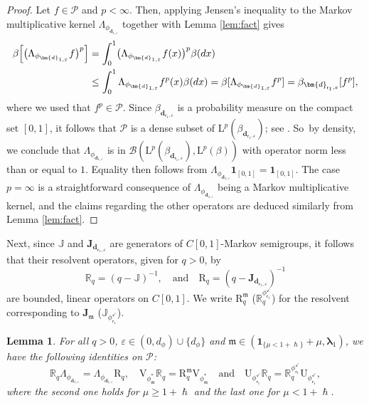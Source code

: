 \documentclass[10pt]{amsart}
\let\epsilon\varepsilon
\theoremstyle{plain}
\newtheorem{lemma}[theorem]{Lemma}
\theoremstyle{definition}
\newcommand{\Poly}{\mathscr{P}}
\newcommand{\calJ}{\mathds{J}}
\newcommand{\Leb}{\mathrm{L}}
\newcommand{\calJd}{\mathbf{J}}
\newcommand{\m}{\mathfrak{m}}
\newcommand{\dpt}{\bm{d}_{\vat,\epsilon}}
\newcommand{\dz}{{\bm{d}}_{1,\epsilon}}
\newcommand{\Bop}[2]{\mathcal{B}(#1,#2)}
\newcommand{\lam}{{\bm{\lambda}_1}}
\newcommand{\vat}{{\mathsf{r}_1}}
\newcommand{\phm}{{\phi_\m^*}}
\renewcommand{\varphi}{{\phi_{\vat}^{\checkmark}}}
\newcommand{\gab}[1][\lam,\mo]{{\beta_{#1}}}
\let\h\hslash
\let\mo\mu
\let\bpsi\beta
\begin{document}
\begin{proof}
Let $f \in \Poly$ and $p < \infty$. Then, applying Jensen's inequality to the Markov multiplicative kernel $\Lambda_{\phi_{\dz}}$ together with Lemma \ref{lem:fact} gives
\begin{align*}
\bpsi \Bigl[ \bigl(\Lambda_{\phi_{\dz}} f\bigr)^p\Bigr] &= \int_0^1 \bigl(\Lambda_{\phi_{\dz}} f(x) \bigr)^p \bpsi(dx)\\
&\leq \int_0^1 \Lambda_{\phi_{\dz}} f^p(x) \bpsi(dx) = \bpsi[\Lambda_{\phi_{\dz}} f^p] = \gab[\dpt] [ f^p],
\end{align*}
where we used that $f^p \in \Poly$. Since $\gab[\dpt]$ is a probability measure on the compact set $[0,1]$, it follows that $\Poly$ is a dense subset of $\Leb^p(\gab[\dpt])$; see \eg \cite[Cor.\,22.10]{Driver03}. So~by density, we conclude that $\Lambda_{\phi_{\dz}}$ is in $\Bop{\Leb^p(\gab[\dpt])}{\Leb^p(\bpsi)}$ with operator norm less than or equal to $1$. Equality then follows from $\Lambda_{\phi_{\dz}} \bm{1}_{[0,1]} = \bm{1}_{[0,1]}$. The case $p = \infty$ is a straightforward consequence of $\Lambda_{\phi_{\dz}}$ being a Markov multiplicative kernel, and the claims regarding the other operators are deduced similarly from Lemma \ref{lem:fact}.
\end{proof}

Next, since $\calJ$ and $\calJd_{\dpt}$ are generators of $C[0,1]$-Markov semigroups, it follows that their resolvent operators, given for $q > 0$, by
\begin{equation*}
\mathds{R}_q = (q-\calJ)^{-1}, \quad \text{and} \quad {\mathrm{R}}_q = (q-\calJd_{\dpt})^{-1}
\end{equation*}
are bounded, linear operators on $C[0,1]$. We write ${\mathrm{R}}_q^\m$ (\resp $\mathds{R}_q^\varphi$) for the resolvent corresponding to $\mathbf{J}_\m$ (\resp $\calJ_\varphi$).

\begin{lemma}
\label{prop:resolvent-intertwining}
For all $q > 0$, $\epsilon \in (0,d_\phi) \cup \{d_\phi\}$ and $\m \in (\bm{1}_{\{\mo < 1+\h\}}+\mo,\lam)$,
we have the following identities on $\Poly$:
\begin{equation*}
\mathds{R}_q \Lambda_{\phi_{\dz}} = \Lambda_{\phi_{\dz}} \mathrm{R}_q, \quad \mathrm{V}_{\phm} \mathds{R}_q = \mathrm{R}_q^\m \mathrm{V}_{\phm} \quad \text{and} \quad {\mathrm{U}_\varphi} \mathds{R}_q = \mathds{R}_q^\varphi {\mathrm{U}}_\varphi,
\end{equation*}
where the second one holds for $\mo \ge 1 +\h$ and the last one for $\mo < 1 + \h$.
\end{lemma}
\end{document}
